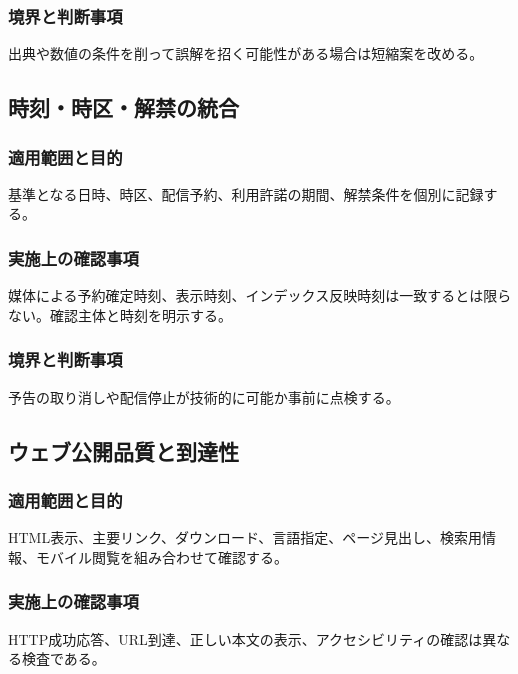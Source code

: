 \documentclass[a4paper,11pt]{article}
\begin{document}
\subsubsection{境界と判断事項}
\par 出典や数値の条件を削って誤解を招く可能性がある場合は短縮案を改める。\par\medskip
\subsection{時刻・時区・解禁の統合}
\subsubsection{適用範囲と目的}
\par 基準となる日時、時区、配信予約、利用許諾の期間、解禁条件を個別に記録する。\par\medskip
\subsubsection{実施上の確認事項}
\par 媒体による予約確定時刻、表示時刻、インデックス反映時刻は一致するとは限らない。確認主体と時刻を明示する。\par\medskip
\subsubsection{境界と判断事項}
\par 予告の取り消しや配信停止が技術的に可能か事前に点検する。\par\medskip
\subsection{ウェブ公開品質と到達性}
\subsubsection{適用範囲と目的}
\par HTML表示、主要リンク、ダウンロード、言語指定、ページ見出し、検索用情報、モバイル閲覧を組み合わせて確認する。\par\medskip
\subsubsection{実施上の確認事項}
\par HTTP成功応答、URL到達、正しい本文の表示、アクセシビリティの確認は異なる検査である。\par\medskip
\end{document}
